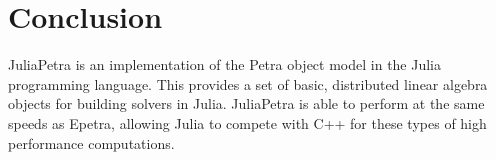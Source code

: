 \documentclass[acmsmall]{acmart}
\begin{document}
\section{Conclusion}

JuliaPetra is an implementation of the Petra object model in the Julia programming language.
This provides a set of basic, distributed linear algebra objects for building solvers in Julia.
JuliaPetra is able to perform at the same speeds as Epetra,
allowing Julia to compete with C++ for these types of high performance computations.


\end{document}
